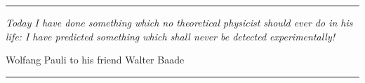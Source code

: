 \begin{flushright}
\begin{minipage}{.6\textwidth}
\begin{flushright}

\vskip5pt

\hrule 

\vskip7pt

{\it Today I have done something which no theoretical physicist should ever do in his life: I have predicted something which shall never be detected experimentally!}

\vskip5pt

\small{Wolfang Pauli to his friend Walter Baade}

\hrule

\vskip5pt


\end{flushright}
\end{minipage}
\end{flushright}
